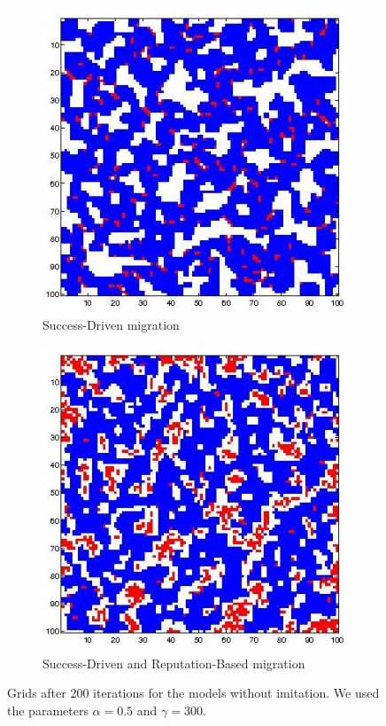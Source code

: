 \documentclass[11pt]{article}
\begin{document}
\begin{figure}[h]
	\begin{subfigure}[t]{0.4\textwidth}
        \includegraphics[width=\textwidth]{../../other/grids/m2-t200-a5-g300.jpg}
	\caption{Success-Driven migration}
	\label{fig:grids_imitation2}
    	\end{subfigure}
	\begin{subfigure}[t]{0.4\textwidth}
        \includegraphics[width=\textwidth]{../../other/grids/m6-t200-a5-g300.jpg}
	\caption{Success-Driven and Reputation-Based migration}
	\label{fig:grids_imitation6}
    	\end{subfigure}

	\caption{Grids after 200 iterations for the models without imitation. We used the parameters $\alpha = 0.5$ and $\gamma = 300$.}
	\label{fig:grids_imitation}
\end{figure}
\end{document}
